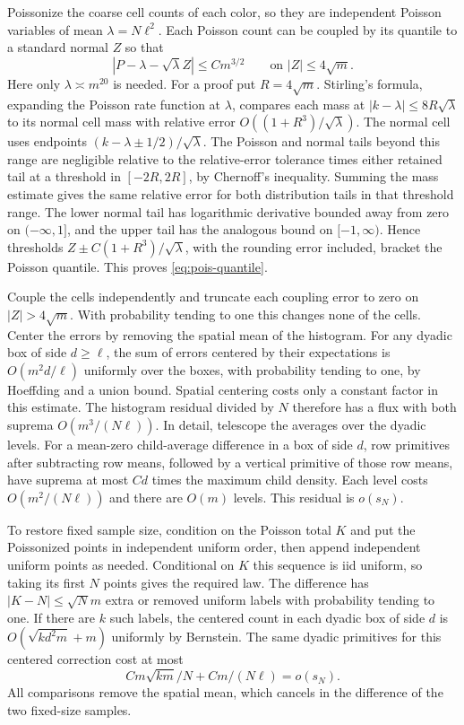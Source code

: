 \documentclass[11pt]{article}
\newcommand{\1}{\mathbf{1}}
\numberwithin{equation}{section}
\begin{document}
Poissonize the coarse cell counts of each color, so they
are independent Poisson variables of mean \(\lambda=N\ell^2\).
Each Poisson count can be coupled by its quantile to a
standard normal \(Z\) so that
\begin{equation}\label{eq:pois-quantile}
 |P-\lambda-\sqrt\lambda Z|\le C m^{3/2}
 \qquad\text{on } |Z|\le 4\sqrt m .
\end{equation}
Here only \(\lambda\asymp m^{20}\) is needed.
For a proof put \(R=4\sqrt m\). Stirling's formula, expanding
the Poisson rate function at \(\lambda\), compares each mass
at \(|k-\lambda|\le8R\sqrt\lambda\) to its normal cell mass
with relative error \(O((1+R^3)/\sqrt\lambda)\).
The normal cell uses endpoints
\((k-\lambda\pm 1/2)/\sqrt\lambda\).
The Poisson and normal tails beyond this range are negligible
relative to the relative-error tolerance times either retained tail
at a threshold in \([-2R,2R]\), by
Chernoff's inequality. Summing the mass estimate gives the
same relative error for both distribution tails in that
threshold range. The lower normal tail has logarithmic
derivative bounded away from zero on \((-\infty,1]\), and
the upper tail has the analogous bound on \([-1,\infty)\).
Hence thresholds \(Z\pm C(1+R^3)/\sqrt\lambda\), with the
rounding error included, bracket the Poisson quantile.
This proves \eqref{eq:pois-quantile}.

Couple the cells independently and truncate each coupling
error to zero on \(|Z|>4\sqrt m\). With probability tending
to one this changes none of the cells. Center the errors
by removing the spatial mean of the histogram.
For any dyadic box of side \(d\ge\ell\), the sum of errors
centered by their expectations is \(O(m^2 d/\ell)\) uniformly
over the boxes, with probability tending to one, by
Hoeffding and a union bound. Spatial centering costs only
a constant factor in this estimate.
The histogram residual divided by \(N\) therefore has a
flux with both suprema \(O(m^3/(N\ell))\).
In detail, telescope the averages over the dyadic levels.
For a mean-zero child-average difference in a box of side
\(d\), row primitives after subtracting row means, followed
by a vertical primitive of those row means, have suprema
at most \(Cd\) times the maximum child density.
Each level costs \(O(m^2/(N\ell))\) and there are \(O(m)\)
levels. This residual is \(o(s_N)\).

To restore fixed sample size, condition on the Poisson
total \(K\) and put the Poissonized points in independent
uniform order, then append independent uniform points as
needed. Conditional on \(K\) this sequence is iid uniform,
so taking its first \(N\) points gives the required law.
The difference has \(|K-N|\le\sqrt N m\) extra or removed
uniform labels with probability tending to one.
If there are \(k\) such labels, the centered count in each
dyadic box of side \(d\) is
\(O(\sqrt{k d^2m}+m)\) uniformly by Bernstein.
The same dyadic primitives for this centered correction cost
at most
\[
 C m\sqrt{km}/N+C m/(N\ell)=o(s_N).
\]
All comparisons remove the spatial mean, which cancels in
the difference of the two fixed-size samples.
\end{document}
